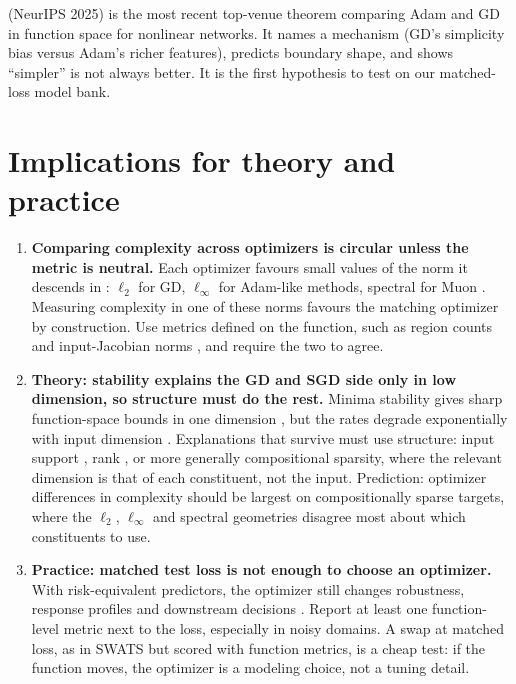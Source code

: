 \documentclass[10pt]{article}
\begin{document}
\textbf{\citet{vasudeva2025rich}} (NeurIPS 2025) is the most recent top-venue theorem comparing Adam
and GD in function space for nonlinear networks. It names a mechanism (GD's simplicity bias versus
Adam's richer features), predicts boundary shape, and shows ``simpler'' is not always better. It is
the first hypothesis to test on our matched-loss model bank.

\section{Implications for theory and practice}
\label{sec:implications}

\begin{enumerate}[leftmargin=1.3em,itemsep=4pt]
\item \textbf{Comparing complexity across optimizers is circular unless the metric is neutral.} Each
optimizer favours small values of the norm it descends in \citep{gunasekar2018geometry}: $\ell_2$
for GD, $\ell_\infty$ for Adam-like methods, spectral for Muon \citep{xie2024adamw,fan2025spectral}. Measuring
complexity in one of these norms favours the matching optimizer by construction. Use metrics defined
on the function, such as region counts \citep{hanin2019regions,li2025regions} and input-Jacobian norms
\citep{novak2018sensitivity}, and require the two to agree.

\item \textbf{Theory: stability explains the GD and SGD side only in low dimension, so structure must
do the rest.} Minima stability gives sharp function-space bounds in one dimension
\citep{mulayoff2021stability,qiao2024stable}, but the rates degrade exponentially with input
dimension \citep{liang2025shattering}. Explanations that survive must use structure: input support
\citep{beneventano2024support}, rank \citep{galanti2022rank,wang2024onewayjumps}, or more generally
compositional sparsity, where the relevant dimension is that of each constituent, not the input.
Prediction: optimizer differences in complexity should be largest on compositionally sparse targets,
where the $\ell_2$, $\ell_\infty$ and spectral geometries disagree most about which constituents to
use.

\item \textbf{Practice: matched test loss is not enough to choose an optimizer.} With risk-equivalent
predictors, the optimizer still changes robustness, response profiles and downstream decisions
\citep{cortesi2026same,vasudeva2025rich}. Report at least one function-level metric next to the loss,
especially in noisy domains. A swap at matched loss, as in SWATS \citep{keskar2017swats} but scored
with function metrics, is a cheap test: if the function moves, the optimizer is a modeling choice,
not a tuning detail.


\end{enumerate}
\end{document}
